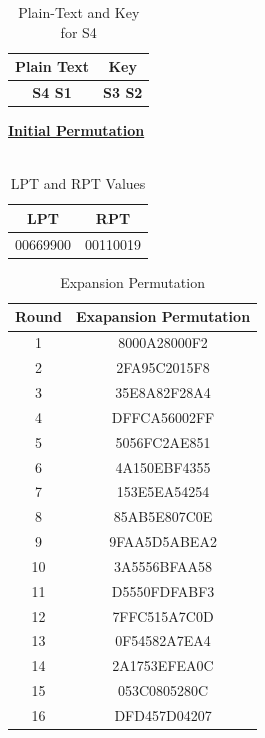 \documentclass[12pt, letterpaper]{article}
\begin{document}
\begin{table}[h]
    \centering
    \begin{tabular}{|c|c|}
        \hline
          Plain Text & Key \\
        \hline
        \textbf{S4 S1} & \textbf{S3 S2} \\
        \hline
    \end{tabular}
    \caption{Plain-Text and Key for S4}
    \label{tab:text-key}
\end{table}






\underline{\textbf{Initial Permutation}} \\
\\
\begin{table}[h]
    \centering
    \begin{tabular}{|c|c|}
        
        \hline
        LPT & RPT \\
        \hline
        00669900 & 00110019   \\
        \hline
    \end{tabular}
    \caption{LPT and RPT Values}
    \label{tab:lpt-rpt}
\end{table}

\begin{table}[h]
    \centering
    \begin{tabular}{|c|c|}
        
        \hline
        Round & Exapansion Permutation \\
        \hline
        1 & 8000A28000F2   \\
        \hline
        2 & 2FA95C2015F8
        \\
        \hline
        3  & 35E8A82F28A4
        \\
         \hline
        4 & DFFCA56002FF
        \\
         \hline
        5 & 5056FC2AE851
        \\
         \hline
        6 & 4A150EBF4355
        \\
         \hline
        7 & 153E5EA54254
        \\
         \hline
        8 & 85AB5E807C0E
        \\
         \hline
        9 & 9FAA5D5ABEA2
        \\
         \hline
        10 & 3A5556BFAA58
        \\
         \hline
        11 & D5550FDFABF3
        \\
         \hline
        12 & 7FFC515A7C0D
        \\
         \hline
        13 & 0F54582A7EA4
        \\
         \hline
        14 & 2A1753EFEA0C
        \\
         \hline
        15 & 053C0805280C
        \\
         \hline
        16 & DFD457D04207
        \\
        \hline
        
    \end{tabular}
    \caption{Expansion Permutation}
    \label{tab:lpt-rpt}
\end{table}
\end{document}
